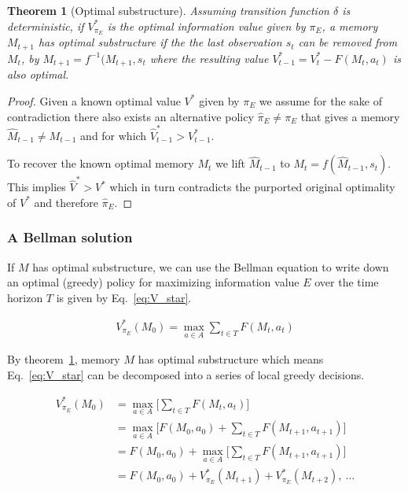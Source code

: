 \documentclass[9pt,twocolumn,twoside]{pnas-new}
\newtheorem{theorem}{Theorem}
\begin{document}
\begin{theorem}[Optimal substructure] \label{theorem:opt_sub}
    Assuming transition function $\delta$ is deterministic, if $V^*_{\pi_E}$ is the optimal information value given by $\pi_E$, a memory $M_{t+1}$ has optimal substructure if the the last observation $s_t$ can be removed from $M_t$, by $M_{t+1} = f^{-1}(M_{t+1}, s_t$ where the resulting value $V^*_{t-1} = V^*_{t} - F(M_t, a_t)$ is also optimal. 
\end{theorem}
\begin{proof}
    Given a known optimal value $V^*$ given by $\pi_E$ we assume for the sake of contradiction there also exists an alternative policy $\hat \pi_E \neq \pi_E$ that gives a memory $\hat M_{t-1} \neq M_{t-1}$ and for which $\hat V^*_{t-1} > V^*_{t-1}$. 

    To recover the known optimal memory $M_t$ we lift $\hat M_{t-1}$ to $M_t = f(\hat M_{t-1}, s_t)$. This implies $\hat V^* > V^*$ which in turn contradicts the purported original optimality of $V^*$ and therefore $\hat \pi_E$.
\end{proof}


\subsubsection*{A Bellman solution}
If $M$ has optimal substructure, we can use the Bellman equation \cite{Bellman} to write down an optimal (greedy) policy for maximizing information value $E$ over the time horizon $T$ is given by Eq.~\ref{eq:V_star}.

\begin{equation} \label{eq:V_star}
    \begin{split}
        V^*_{\pi_E}(M_0) = \max_{a \in A} \sum_{t \in T} F(M_t, a_t)
    \end{split}
\end{equation}

By theorem~\ref{theorem:opt_sub}, memory $M$ has optimal substructure which means Eq.~\ref{eq:V_star} can be decomposed into a series of local greedy decisions.

\begin{equation} \label{eq:bellman_seq}
    \begin{split}
        V^*_{\pi_E}(M_0) &= \max_{a \in A} \Big [\sum_{t \in T} F(M_t, a_t)\Big ]\\
                         &= \max_{a \in A} \Big [F(M_0, a_0) + \sum_{t \in T} F(M_{t+1}, a_{t+1})\Big ]\\
                         &= F(M_0, a_0) + \max_{a \in A} \Big [\sum_{t \in T} F(M_{t+1}, a_{t+1}) \Big ]\\
                         &= F(M_0, a_0) + V^*_{\pi_E}(M_{t+1}) + V^*_{\pi_E}(M_{t+2}),\ \ldots
    \end{split}
\end{equation}
\end{document}
